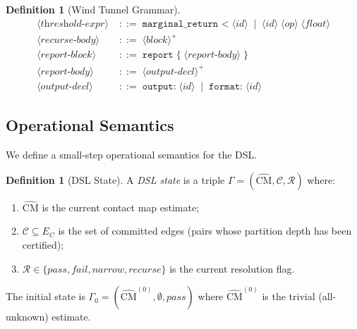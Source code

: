 \documentclass[12pt,a4paper,twocolumn]{article}
\theoremstyle{plain}
\theoremstyle{definition}
\newtheorem{definition}[theorem]{Definition}
\theoremstyle{remark}
\newcommand{\CM}{\mathrm{CM}}
\begin{document}
\begin{definition}[Wind Tunnel Grammar]
\begin{align*}
\langle\textit{threshold-expr}\rangle &\;::=\;
  \texttt{marginal\_return <}\;\langle\textit{id}\rangle
  \;\mid\; \langle\textit{id}\rangle\;\langle\textit{op}\rangle\;\langle\textit{float}\rangle \\
\langle\textit{recurse-body}\rangle &\;::=\;
  \langle\textit{block}\rangle^+ \\[4pt]
\langle\textit{report-block}\rangle &\;::=\;
  \texttt{report}\;\texttt{\{}\;\langle\textit{report-body}\rangle\;\texttt{\}} \\
\langle\textit{report-body}\rangle &\;::=\;
  \langle\textit{output-decl}\rangle^+ \\
\langle\textit{output-decl}\rangle &\;::=\;
  \texttt{output:}\;\langle\textit{id}\rangle
  \;\mid\; \texttt{format:}\;\langle\textit{id}\rangle
\end{align*}
\end{definition}

\subsection{Operational Semantics}

We define a small-step operational semantics for the DSL.

\begin{definition}[DSL State]
\label{def:dsl-state}
A \emph{DSL state} is a triple $\Gamma = (\hat{\CM}, \mathcal{C}, \mathcal{R})$
where:
\begin{enumerate}[label=(\roman*)]
  \item $\hat{\CM}$ is the current contact map estimate;
  \item $\mathcal{C} \subseteq E_C$ is the set of committed edges (pairs
    whose partition depth has been certified);
  \item $\mathcal{R} \in \{\textit{pass}, \textit{fail}, \textit{narrow},
    \textit{recurse}\}$ is the current resolution flag.
\end{enumerate}
The initial state is $\Gamma_0 = (\hat{\CM}^{(0)}, \emptyset, \textit{pass})$
where $\hat{\CM}^{(0)}$ is the trivial (all-unknown) estimate.
\end{definition}
\end{document}

